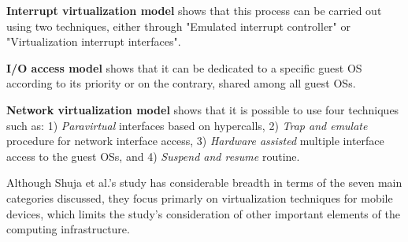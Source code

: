 	\textbf{Interrupt virtualization model} shows that this process can be carried out using two techniques, either through "Emulated interrupt controller" or "Virtualization interrupt interfaces".

	\textbf{I/O access model} shows that it can be dedicated to a specific guest OS according to its priority or on the contrary, shared among all guest OSs. 

	\textbf{Network virtualization model} shows that it is possible to use four techniques such as: 1) \textit{Paravirtual} interfaces based on hypercalls, 2) \textit{Trap and emulate} procedure for network interface access, 3) \textit{Hardware assisted} multiple interface access to the guest OSs, and 4) \textit{Suspend and resume} routine. 
	
	Although Shuja et al.'s study \cite{Shuja2016} has considerable breadth in terms of the seven main categories discussed, they focus primarly on virtualization techniques for mobile devices, which limits the study's consideration of other important elements of the computing infrastructure.
	
	
	
	
	
	
	
	
	
	
	
	
	
	